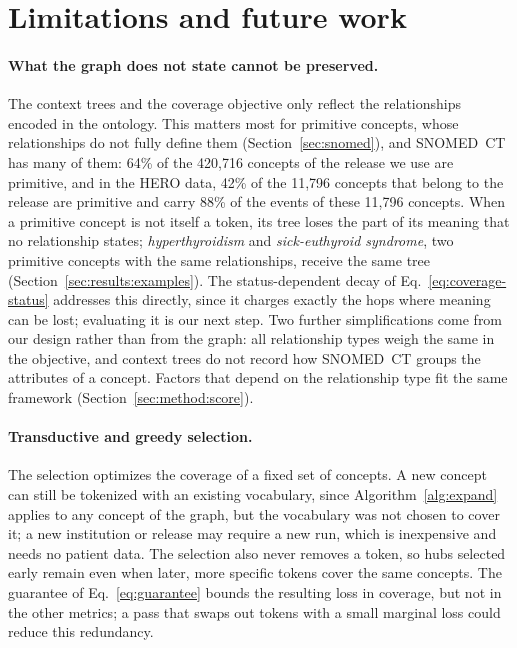 \section{Limitations and future work}
\label{sec:limitations}

\paragraph{What the graph does not state cannot be preserved.}
The context trees and the coverage objective only reflect the relationships encoded in the ontology.
This matters most for primitive concepts, whose relationships do not fully define them (Section~\ref{sec:snomed}), and SNOMED~CT has many of them: 64\% of the 420,716 concepts of the release we use are primitive, and in the HERO data, 42\% of the 11,796 concepts that belong to the release are primitive and carry 88\% of the events of these 11,796 concepts.
When a primitive concept is not itself a token, its tree loses the part of its meaning that no relationship states; \textit{hyperthyroidism} and \textit{sick-euthyroid syndrome}, two primitive concepts with the same relationships, receive the same tree (Section~\ref{sec:results:examples}).
The status-dependent decay of Eq.~\eqref{eq:coverage-status} addresses this directly, since it charges exactly the hops where meaning can be lost; evaluating it is our next step.
Two further simplifications come from our design rather than from the graph: all relationship types weigh the same in the objective, and context trees do not record how SNOMED~CT groups the attributes of a concept.
Factors that depend on the relationship type fit the same framework (Section~\ref{sec:method:score}).

\paragraph{Transductive and greedy selection.}
The selection optimizes the coverage of a fixed set of concepts.
A new concept can still be tokenized with an existing vocabulary, since Algorithm~\ref{alg:expand} applies to any concept of the graph, but the vocabulary was not chosen to cover it; a new institution or release may require a new run, which is inexpensive and needs no patient data.
The selection also never removes a token, so hubs selected early remain even when later, more specific tokens cover the same concepts.
The guarantee of Eq.~\eqref{eq:guarantee} bounds the resulting loss in coverage, but not in the other metrics; a pass that swaps out tokens with a small marginal loss could reduce this redundancy.


